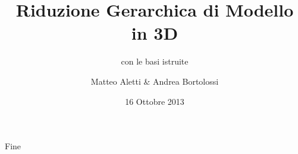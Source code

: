 \documentclass{beamer}
\author[Aletti \& Bortolossi]{Matteo Aletti \& Andrea Bortolossi}
\title[Hi-Mod in 3D]{Riduzione Gerarchica di Modello in 3D}
\subtitle{con le basi istruite}
\institute[PoliMi]{Politecnico di Milano}
\date{16 Ottobre 2013}
\theoremstyle{plain}
\newcommand{\titleslide}[1]{
\begin{frame}
 \begin{center}
  \Huge\textcolor{blue!70}{#1}
 \end{center}

\end{frame}
}
\begin{document}
\begin{frame}
\maketitle
\end{frame}
\begin{frame}
\tableofcontents
\end{frame}



\titleslide{Fine}
\appendix

\end{document}
